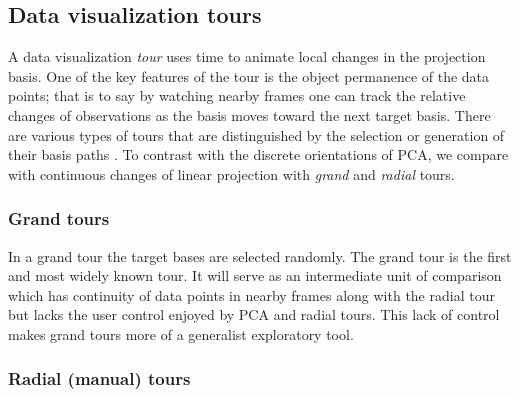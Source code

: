 \documentclass{monashthesis}
\begin{document}
\hypertarget{data-visualization-tours}{%
\subsection{Data visualization tours}\label{data-visualization-tours}}

A data visualization \emph{tour} uses time to animate local changes in the projection basis. One of the key features of the tour is the object permanence of the data points; that is to say by watching nearby frames one can track the relative changes of observations as the basis moves toward the next target basis. There are various types of tours that are distinguished by the selection or generation of their basis paths \autocite{lee_review_2021,cook_grand_2008}. To contrast with the discrete orientations of PCA, we compare with continuous changes of linear projection with \emph{grand} and \emph{radial} tours.

\hypertarget{grand-tours}{%
\subsubsection{Grand tours}\label{grand-tours}}

In a grand tour \autocite{asimov_grand_1985} the target bases are selected randomly. The grand tour is the first and most widely known tour. It will serve as an intermediate unit of comparison which has continuity of data points in nearby frames along with the radial tour but lacks the user control enjoyed by PCA and radial tours. This lack of control makes grand tours more of a generalist exploratory tool.

\hypertarget{radial-manual-tours}{%
\subsubsection{Radial (manual) tours}\label{radial-manual-tours}}
\end{document}
